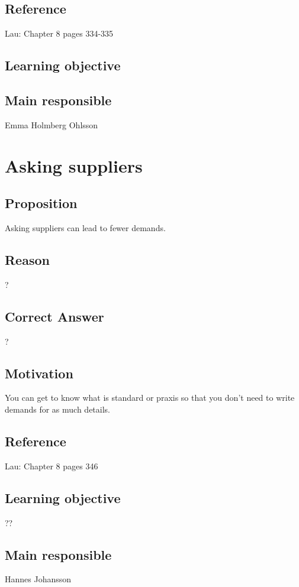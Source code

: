 \documentclass[a4paper]{article}
\begin{document}
\subsection*{Reference}
Lau: Chapter 8 pages 334-335
\subsection*{Learning objective}

\subsection*{Main responsible}
Emma Holmberg Ohlsson


\section{Asking suppliers}
\subsection*{Proposition}
Asking suppliers can lead to fewer demands.
\subsection*{Reason}
?
\subsection*{Correct Answer}
?
\subsection*{Motivation}
You can get to know what is standard or praxis so that you don't need to write demands for as much details.
\subsection*{Reference}
Lau: Chapter 8 pages 346
\subsection*{Learning objective}
??
\subsection*{Main responsible}
Hannes Johansson
\end{document}
